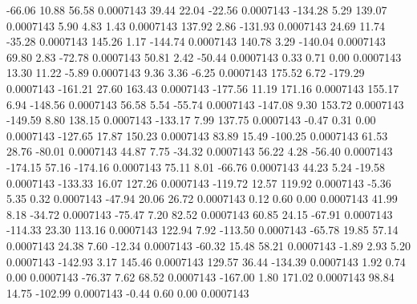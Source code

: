       -66.06       10.88       56.58     0.0007143
       39.44       22.04      -22.56     0.0007143
     -134.28        5.29      139.07     0.0007143
        5.90        4.83        1.43     0.0007143
      137.92        2.86     -131.93     0.0007143
       24.69       11.74      -35.28     0.0007143
      145.26        1.17     -144.74     0.0007143
      140.78        3.29     -140.04     0.0007143
       69.80        2.83      -72.78     0.0007143
       50.81        2.42      -50.44     0.0007143
        0.33        0.71        0.00     0.0007143
       13.30       11.22       -5.89     0.0007143
        9.36        3.36       -6.25     0.0007143
      175.52        6.72     -179.29     0.0007143
     -161.21       27.60      163.43     0.0007143
     -177.56       11.19      171.16     0.0007143
      155.17        6.94     -148.56     0.0007143
       56.58        5.54      -55.74     0.0007143
     -147.08        9.30      153.72     0.0007143
     -149.59        8.80      138.15     0.0007143
     -133.17        7.99      137.75     0.0007143
       -0.47        0.31        0.00     0.0007143
     -127.65       17.87      150.23     0.0007143
       83.89       15.49     -100.25     0.0007143
       61.53       28.76      -80.01     0.0007143
       44.87        7.75      -34.32     0.0007143
       56.22        4.28      -56.40     0.0007143
     -174.15       57.16     -174.16     0.0007143
       75.11        8.01      -66.76     0.0007143
       44.23        5.24      -19.58     0.0007143
     -133.33       16.07      127.26     0.0007143
     -119.72       12.57      119.92     0.0007143
       -5.36        5.35        0.32     0.0007143
      -47.94       20.06       26.72     0.0007143
        0.12        0.60        0.00     0.0007143
       41.99        8.18      -34.72     0.0007143
      -75.47        7.20       82.52     0.0007143
       60.85       24.15      -67.91     0.0007143
     -114.33       23.30      113.16     0.0007143
      122.94        7.92     -113.50     0.0007143
      -65.78       19.85       57.14     0.0007143
       24.38        7.60      -12.34     0.0007143
      -60.32       15.48       58.21     0.0007143
       -1.89        2.93        5.20     0.0007143
     -142.93        3.17      145.46     0.0007143
      129.57       36.44     -134.39     0.0007143
        1.92        0.74        0.00     0.0007143
      -76.37        7.62       68.52     0.0007143
     -167.00        1.80      171.02     0.0007143
       98.84       14.75     -102.99     0.0007143
       -0.44        0.60        0.00     0.0007143
